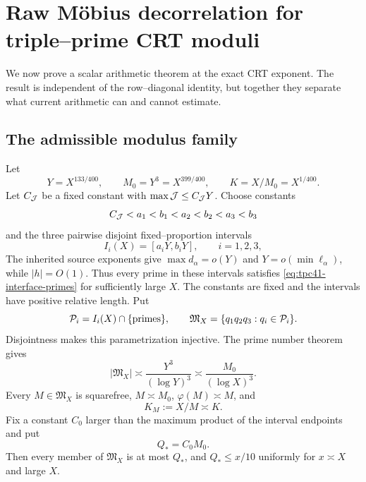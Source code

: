 \section{Raw M\"obius decorrelation for triple--prime CRT moduli}
\label{sec:tpc41-triple-prime}

We now prove a scalar arithmetic theorem at the exact CRT exponent.  The
result is independent of the row--diagonal identity, but together they
separate what current arithmetic can and cannot estimate.

\subsection{The admissible modulus family}

Let
\begin{equation}
 Y=X^{133/400},
 \qquad M_0=Y^3=X^{399/400},
 \qquad K=X/M_0=X^{1/400}.
 \label{eq:tpc41-variance-scales}
\end{equation}
Let \(C_{\mathcal J}\) be a fixed constant with
\(\max\mathcal J\le C_{\mathcal J}Y\).  Choose constants
\begin{equation}
 C_{\mathcal J}<a_1<b_1<a_2<b_2<a_3<b_3
 \label{eq:tpc41-interval-constants}
\end{equation}
and the three pairwise disjoint fixed--proportion intervals
\begin{equation}
 I_i(X)=[a_iY,b_iY],
 \qquad i=1,2,3,
 \label{eq:tpc41-prime-intervals}
\end{equation}
The inherited source exponents give
\(\max d_\alpha=o(Y)\) and \(Y=o(\min\ell_\alpha)\), while
\(|h|=O(1)\).  Thus every prime in these intervals satisfies
\eqref{eq:tpc41-interface-primes} for sufficiently large \(X\).  The
constants are fixed and the intervals have positive relative length.  Put
\begin{equation}
 \mathcal P_i=I_i(X)\cap\{\text{primes}\},
 \qquad
 \mathfrak M_X
 =\{q_1q_2q_3:q_i\in\mathcal P_i\}.
 \label{eq:tpc41-modulus-family}
\end{equation}
Disjointness makes this parametrization injective.  The prime number
theorem gives
\begin{equation}
 |\mathfrak M_X|\asymp\frac{Y^3}{(\log Y)^3}
 \asymp\frac{M_0}{(\log X)^3}.
 \label{eq:tpc41-family-size}
\end{equation}
Every \(M\in\mathfrak M_X\) is squarefree,
\(M\asymp M_0\), \(\varphi(M)\asymp M\), and
\begin{equation}
 K_M:=X/M\asymp K.
 \label{eq:tpc41-KM}
\end{equation}
Fix a constant \(C_0\) larger than the maximum product of the interval
endpoints and put
\begin{equation}
 Q_*=C_0M_0.
 \label{eq:tpc41-Q-star}
\end{equation}
Then every member of \(\mathfrak M_X\) is at most \(Q_*\), and
\(Q_*\le x/10\) uniformly for \(x\asymp X\) and large \(X\).


